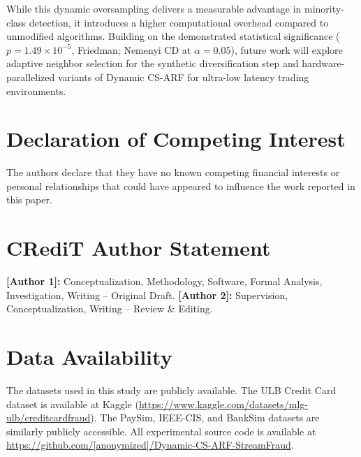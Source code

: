 \documentclass[review,12pt]{elsarticle}
\begin{document}
While this dynamic oversampling delivers a measurable advantage in minority-class detection, it introduces a higher computational overhead compared to unmodified algorithms. Building on the demonstrated statistical significance ($p=1.49\times10^{-5}$, Friedman; Nemenyi CD at $\alpha=0.05$), future work will explore adaptive neighbor selection for the synthetic diversification step and hardware-parallelized variants of Dynamic CS-ARF for ultra-low latency trading environments.

\section*{Declaration of Competing Interest}
The authors declare that they have no known competing financial interests or personal relationships that could have appeared to influence the work reported in this paper.

\section*{CRediT Author Statement}
\textbf{[Author 1]:} Conceptualization, Methodology, Software, Formal Analysis, Investigation, Writing -- Original Draft. 
\textbf{[Author 2]:} Supervision, Conceptualization, Writing -- Review \& Editing.

\section*{Data Availability}
The datasets used in this study are publicly available. The ULB Credit Card dataset is available at Kaggle (\url{https://www.kaggle.com/datasets/mlg-ulb/creditcardfraud}). The PaySim, IEEE-CIS, and BankSim datasets are similarly publicly accessible. All experimental source code is available at \url{https://github.com/[anonymized]/Dynamic-CS-ARF-StreamFraud}.



\end{document}
